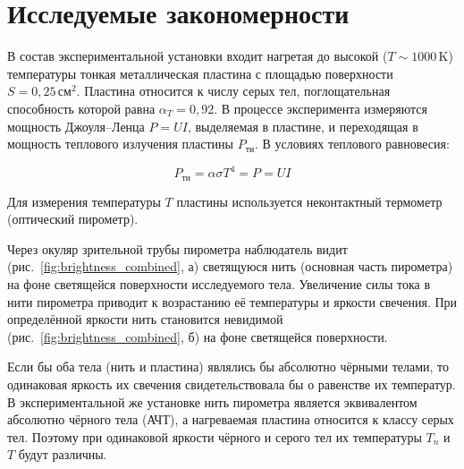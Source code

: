 \section{Исследуемые закономерности}

В состав экспериментальной установки входит нагретая до высокой (\( T \sim 1000\,\text{K} \)) температуры тонкая металлическая пластина с площадью поверхности \( S = 0{,}25\,\text{см}^2 \). Пластина относится к числу серых тел, поглощательная способность которой равна \( \alpha_T = 0{,}92 \). В процессе эксперимента измеряются мощность Джоуля–Ленца \( P = UI \), выделяемая в пластине, и переходящая в мощность теплового излучения пластины \( P_{\text{ти}} \). В условиях теплового равновесия:

\[
P_{\text{ти}} = \alpha \sigma T^4 = P = UI
\]

Для измерения температуры \( T \) пластины используется неконтактный термометр (оптический пирометр).

Через окуляр зрительной трубы пирометра наблюдатель видит (рис.~\ref{fig:brightness_combined}, а) светящуюся нить (основная часть пирометра) на фоне светящейся поверхности исследуемого тела. Увеличение силы тока в нити пирометра приводит к возрастанию её температуры и яркости свечения. При определённой яркости нить становится невидимой (рис.~\ref{fig:brightness_combined}, б) на фоне светящейся поверхности.

Если бы оба тела (нить и пластина) являлись бы абсолютно чёрными телами, то одинаковая яркость их свечения свидетельствовала бы о равенстве их температур. В экспериментальной же установке нить пирометра является эквивалентом абсолютно чёрного тела (АЧТ), а нагреваемая пластина относится к классу серых тел. Поэтому при одинаковой яркости чёрного и серого тел их температуры \( T_n \) и \( T \) будут различны.

